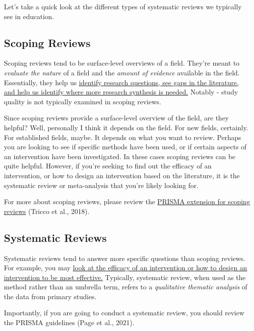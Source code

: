 \documentclass[
]{book}
\begin{document}
Let's take a quick look at the different types of systematic reviews we typically see in education.

\hypertarget{scoping-reviews}{%
\subsection{Scoping Reviews}\label{scoping-reviews}}

Scoping reviews tend to be surface-level overviews of a field. They're meant to \emph{evaluate the nature} of a field and the \emph{amount of evidence} available in the field. Essentially, they help us \ul{identify research questions, see gaps in the literature, and help us identify where more research synthesis is needed.} Notably - study quality is not typically examined in scoping reviews.

Since scoping reviews provide a surface-level overview of the field, are they helpful? Well, personally I think it depends on the field. For new fields, certainly. For established fields, maybe. It depends on what you want to review. Perhaps you are looking to see if specific methods have been used, or if certain aspects of an intervention have been investigated. In these cases scoping reviews can be quite helpful. However, if you're seeking to find out the efficacy of an intervention, or how to design an intervention based on the literature, it is the systematic review or meta-analysis that you're likely looking for.

For more about scoping reviews, please review the \href{http://www.prisma-statement.org/Extensions/ScopingReviews}{PRISMA extension for scoping reviews} (Tricco et al., 2018)\citep{tricco2018}.

\hypertarget{systematic-reviews}{%
\subsection{Systematic Reviews}\label{systematic-reviews}}

Systematic reviews tend to answer more specific questions than scoping reviews. For example, you may \ul{look at the efficacy of an intervention or how to design an intervention to be most effective.} Typically, systematic review, when used as the method rather than an umbrella term, refers to a \emph{qualitative thematic analysis} of the data from primary studies.

Importantly, if you are going to conduct a systematic review, you should review the PRISMA guidelines (Page et al., 2021)\citep{page2021}.
\end{document}
